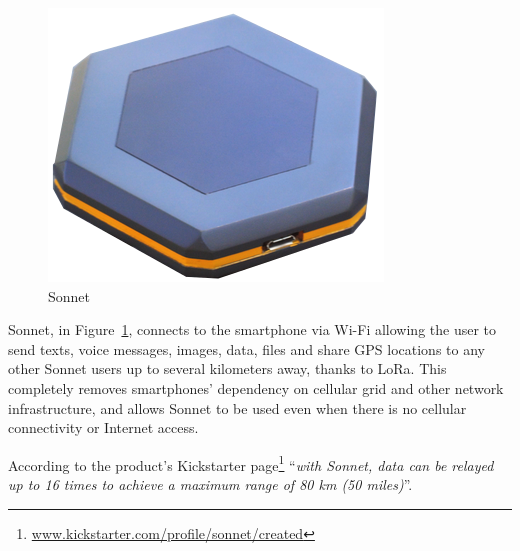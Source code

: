 				\begin{minipage}{0.38\textwidth}%
					\begin{figure}[H]
						\centering
						\includegraphics[width=.8\textwidth]{resources/img/chap4/sonnet}
						\caption{Sonnet}
						\label{img:sonnet}
					\end{figure}
				\end{minipage}%
				\hfill%
				\begin{minipage}{0.62\textwidth}\raggedright
					Sonnet\footnotemark, in Figure~\ref{img:sonnet}, connects to the smartphone via Wi-Fi allowing the user to send texts, voice messages, images, data, files and share GPS locations to any other Sonnet users up to several kilometers away, thanks to LoRa.
					This completely removes smartphones' dependency on cellular grid and other network infrastructure, and allows Sonnet to be used even when there is no cellular connectivity or Internet access.
				\end{minipage}		
			
				According to the product's Kickstarter page\footnote{ \url{www.kickstarter.com/profile/sonnet/created}} ``\textit{with Sonnet, data can be relayed up to 16 times to achieve a maximum range of 80 km (50 miles)}''.

